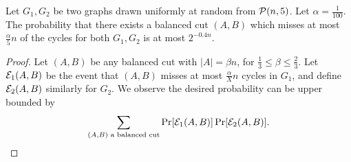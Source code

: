 \begin{lem}\label{lem:two-packing}
    Let $G_1, G_2$ be two graphs drawn uniformly at random from $\mathcal{P}(n,5)$. Let $\alpha = \frac{1}{100}$. The probability that there exists a balanced cut $(A,B)$ which misses at most $ \frac{\alpha}{5}n$ of the cycles for both $G_1, G_2$ is at most $2^{-0.4n}$.
\end{lem}
\begin{proof}
Let $(A,B)$ be any balanced cut with $|A| = \beta n$, for $\frac{1}{3} \leq \beta \leq \frac{2}{3}$. Let $\mathcal{E}_1(A,B)$ be the event that $(A,B)$ misses at most $\frac{\alpha}{X}n$ cycles in $G_1$, and define $\mathcal{E}_2(A,B)$ similarly for $G_2$. We observe the desired probability can be upper bounded by
\begin{equation}\label{eq:total-prob}
    \sum_{\substack{(A,B) \text{ a balanced cut}}} \Pr[\mathcal{E}_1(A,B)] \Pr[\mathcal{E}_2(A,B)].
\end{equation}


\end{proof}
